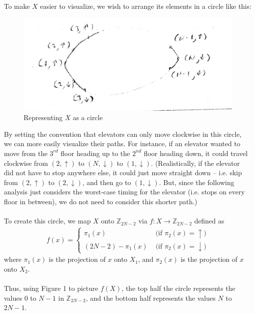 \documentclass[letterpaper]{article} %
\begin{document}
To make $X$ easier to visualize, we wish to arrange its elements in a circle like this:\\
\begin{figure}
  \centering
    \includegraphics[scale=0.2]{circle}
  \caption{Representing $X$ as a circle}
\end{figure}
By setting the convention that elevators can only move clockwise in this circle, we can more easily visualize their paths. For instance, if an elevator wanted to move from the $3^{rd}$ floor heading up to the $2^{nd}$ floor heading down, it could travel clockwise from $(2, \uparrow)$ to $(N, \downarrow)$ to $(1, \downarrow)$. (Realistically, if the elevator did not have to stop anywhere else, it could just move straight down -- i.e. skip from $(2, \uparrow)$ to $(2, \downarrow)$, and then go to $(1, \downarrow)$. But, since the following analysis just considers the worst-case timing for the elevator (i.e. stops on every floor in between), we do not need to consider this shorter path.)\\\\
To create this circle, we map $X$ onto $\mathbb{Z}_{2N - 2}$ via $f: X \rightarrow \mathbb{Z}_{2N - 2}$ defined as \\
\begin{align*}
    f(x)=\left\{
                \begin{array}{ll}
                  \pi_{1}(x) &\text{ (if $\pi_2(x) = \uparrow$)}\\
                  (2N - 2) - \pi_{1}(x) &\text{ (if $\pi_2(x) = \downarrow$)}
                \end{array}
              \right.
\end{align*}
where $\pi_{1}(x)$ is the projection of $x$ onto $X_1$, and $\pi_{2}(x)$ is the projection of $x$ onto $X_2$. \\\\
Thus, using Figure 1 to picture $f(X)$, the top half the circle represents the values $0$ to $N - 1$ in $\mathbb{Z}_{2N - 2}$, and the bottom half represents the values $N$ to $2N - 1$.
\end{document}
